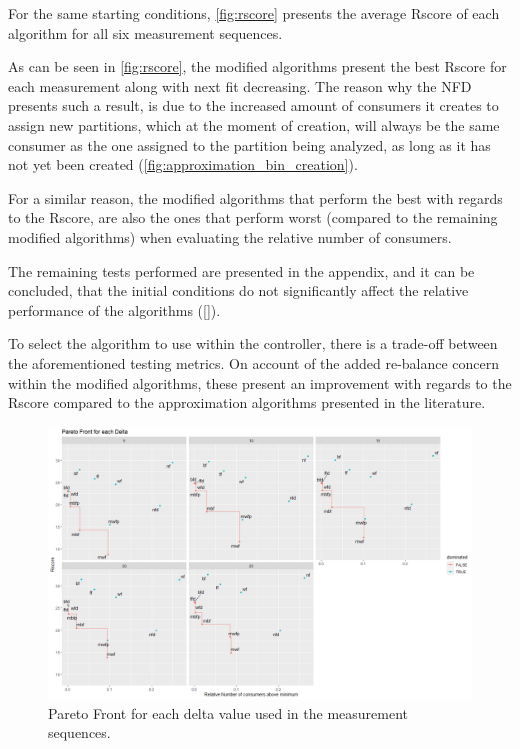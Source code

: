For the same starting conditions, \ref{fig:rscore} presents the average Rscore of each algorithm for all six measurement sequences.

As can be seen in \ref{fig:rscore}, the modified algorithms present the best Rscore for each measurement along with next fit decreasing. The reason why the NFD presents such a result, is due to the increased amount of consumers it creates to assign new partitions, which at the moment of creation, will always be the same consumer as the one assigned to the partition being analyzed, as long as it has not yet been created (\ref{fig:approximation_bin_creation}).

For a similar reason, the modified algorithms that perform the best with regards to the Rscore, are also the ones that perform worst (compared to the remaining modified algorithms) when evaluating the relative number of consumers.

The remaining tests performed are presented in the appendix, and it can be concluded, that the initial conditions do not significantly affect the relative performance of the algorithms (\ref{}).

To select the algorithm to use within the controller, there is a trade-off between the aforementioned testing metrics. On account of the added re-balance concern within the modified algorithms, these present an improvement with regards to the Rscore compared to the approximation algorithms presented in the literature.

\begin{figure}[H]
    \centering
    \includegraphics[width=\textwidth]{images/Facet Wrap Pareto Front.png}
\caption{Pareto Front for each delta value used in the measurement sequences.}
\label{fig:pareto_front}
\end{figure}

